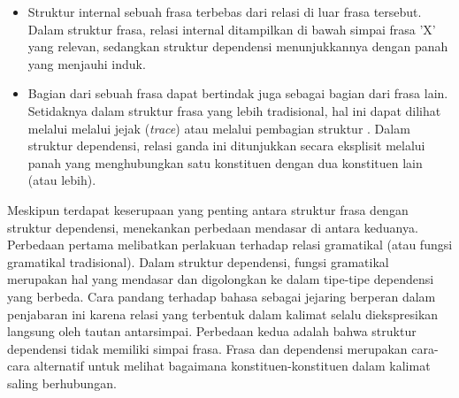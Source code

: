 \begin{itemize}
\item Struktur internal sebuah frasa terbebas dari relasi di luar frasa tersebut. Dalam struktur frasa, relasi internal ditampilkan di bawah simpai frasa 'X' yang relevan, sedangkan struktur dependensi menunjukkannya dengan panah yang menjauhi induk.
\item Bagian dari sebuah frasa dapat bertindak juga sebagai bagian dari frasa lain. Setidaknya dalam struktur frasa yang lebih tradisional, hal ini dapat dilihat melalui melalui jejak (\textit{trace}) \citep{chomsky1986barriers} atau melalui pembagian struktur \citep{pollard1994head}. Dalam struktur dependensi, relasi ganda ini ditunjukkan secara eksplisit melalui panah yang menghubungkan satu konstituen dengan dua konstituen lain (atau lebih).
\end{itemize}

Meskipun terdapat keserupaan yang penting antara struktur frasa dengan struktur dependensi, \cite{hudson2007language} menekankan perbedaan mendasar di antara keduanya. Perbedaan pertama melibatkan perlakuan terhadap relasi gramatikal (atau fungsi gramatikal tradisional). Dalam struktur dependensi, fungsi gramatikal merupakan hal yang mendasar dan digolongkan ke dalam tipe-tipe dependensi yang berbeda. Cara pandang \cite{hudson2007language} terhadap bahasa sebagai jejaring berperan dalam penjabaran ini karena relasi yang terbentuk dalam kalimat selalu diekspresikan langsung oleh tautan antarsimpai. Perbedaan kedua adalah bahwa struktur dependensi tidak memiliki simpai frasa. Frasa dan dependensi merupakan cara-cara alternatif untuk melihat bagaimana konstituen-konstituen dalam kalimat saling berhubungan.

